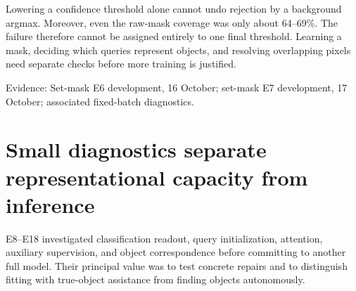 \documentclass[11pt,a4paper]{article}
\newcommand{\src}[1]{\par{\footnotesize\color{gray}Evidence: #1}\par}
\begin{document}
Lowering a confidence threshold alone cannot undo rejection by a background argmax. Moreover, even the raw-mask coverage was only about 64--69\%. The failure therefore cannot be assigned entirely to one final threshold. Learning a mask, deciding which queries represent objects, and resolving overlapping pixels need separate checks before more training is justified.

\src{Set-mask E6 development, 16 October; set-mask E7 development, 17 October; associated fixed-batch diagnostics.}

\section{Small diagnostics separate representational capacity from inference}

E8--E18 investigated classification readout, query initialization, attention, auxiliary supervision, and object correspondence before committing to another full model. Their principal value was to test concrete repairs and to distinguish fitting with true-object assistance from finding objects autonomously.
\end{document}
